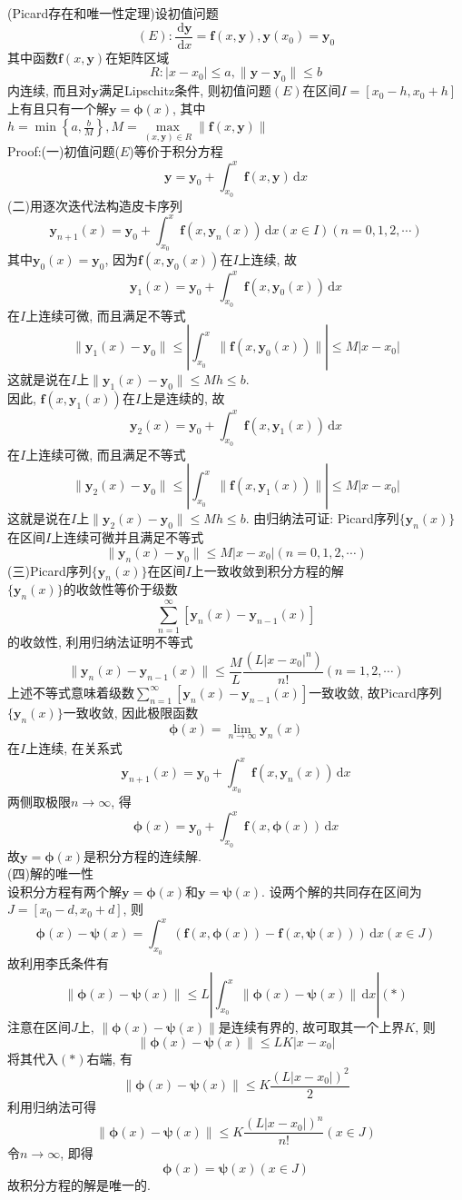 \documentclass[titlepage,11pt,a4paper,twoside]{report}
\makeatletter
\newcommand\diff{\,\mathrm{d}}
\newenvironment{solve}{\par
	\pushQED{\qed}%
	\normalfont \topsep1\p@\@plus6\p@\relax
	\trivlist
	\item\relax
	{\hspace*{\parindent}{\heiti 解}\@addpunct{:}}\hspace\labelsep\ignorespaces
}{%
	\popQED\endtrivlist\@endpefalse
}
\makeatother
\begin{document}
\begin{solve}
(Picard存在和唯一性定理)设初值问题
\[(E):\frac{\diff\bm{y}}{\diff x}=\bm{f}(x,\bm{y}),\bm{y}(x_0)=\bm{y}_0\]
其中函数$\bm{f}(x,\bm{y})$在矩阵区域\[R:|x-x_0|\leq a,\|\bm{y}-\bm{y}_0\|\leq b\]
内连续, 而且对$\bm{y}$满足Lipschitz条件, 则初值问题$(E)$在区间$I=[x_0-h,x_0+h]$上有且只有一个解$\bm{y}=\bm{\phi}(x)$, 其中$\displaystyle h=\min\left\{a,\frac{b}{M}\right\},M=\max\limits_{(x,\bm{y})\in R}\|\bm{f}(x,\bm{y})\|$\\
Proof:(一)初值问题($E$)等价于积分方程
\[\bm{y}=\bm{y}_0+\int_{x_0}^x\bm{f}(x,\bm{y})\diff x\]
(二)用逐次迭代法构造皮卡序列
\[\bm{y}_{n+1}(x)=\bm{y}_0+\int_{x_0}^x\bm{f}(x,\bm{y}_n(x))\diff x(x\in I)(n=0,1,2,\cdots)\]
其中$\bm{y}_0(x)=\bm{y}_0$, 因为$\bm{f}(x,\bm{y}_0(x))$在$I$上连续, 故
\[\bm{y}_1(x)=\bm{y}_0+\int_{x_0}^x\bm{f}(x,\bm{y}_0(x))\diff x\]
在$I$上连续可微, 而且满足不等式
\[\|\bm{y}_1(x)-\bm{y}_0\|\leq\left|\int_{x_0}^x\|\bm{f}(x,\bm{y}_0(x))\|\right|\leq M|x-x_0|\]
这就是说在$I$上$\|\bm{y}_1(x)-\bm{y}_0\|\leq Mh\leq b$.\\
因此, $\bm{f}(x,\bm{y}_1(x))$在$I$上是连续的, 故
\[\bm{y}_2(x)=\bm{y}_0+\int_{x_0}^x\bm{f}(x,\bm{y}_1(x))\diff x\]
在$I$上连续可微, 而且满足不等式
\[\|\bm{y}_2(x)-\bm{y}_0\|\leq\left|\int_{x_0}^x\|\bm{f}(x,\bm{y}_1(x))\|\right|\leq M|x-x_0|\]
这就是说在$I$上$\|\bm{y}_2(x)-\bm{y}_0\|\leq Mh\leq b$.
由归纳法可证: Picard序列$\{\bm{y}_n(x)\}$在区间$I$上连续可微并且满足不等式
\[\|\bm{y}_n(x)-\bm{y}_0\|\leq M|x-x_0|(n=0,1,2,\cdots)\]
(三)Picard序列$\{\bm{y}_n(x)\}$在区间$I$上一致收敛到积分方程的解\\
$\{\bm{y}_n(x)\}$的收敛性等价于级数
\[\sum_{n=1}^{\infty}[\bm{y}_{n}(x)-\bm{y}_{n-1}(x)]\]
的收敛性, 利用归纳法证明不等式
\[\|\bm{y}_n(x)-\bm{y}_{n-1}(x)\|\leq\frac{M}{L}\frac{(L|x-x_0|^n)}{n!}(n=1,2,\cdots)\]
上述不等式意味着级数$\sum\limits_{n=1}^{\infty}[\bm{y}_{n}(x)-\bm{y}_{n-1}(x)]$一致收敛, 故Picard序列$\{\bm{y}_n(x)\}$一致收敛, 因此极限函数
\[\bm{\phi}(x)=\lim_{n\to\infty}\bm{y}_n(x)\]
在$I$上连续, 在关系式
\[\bm{y}_{n+1}(x)=\bm{y}_0+\int_{x_0}^x\bm{f}(x,\bm{y}_n(x))\diff x\]
两侧取极限$n\to\infty$, 得
\[\bm{\phi}(x)=\bm{y}_0+\int_{x_0}^x\bm{f}(x,\bm{\phi}(x))\diff x\]
故$\bm{y}=\bm{\phi}(x)$是积分方程的连续解.\\
(四)解的唯一性\\
设积分方程有两个解$\bm{y}=\bm{\phi}(x)$和$\bm{y}=\bm{\psi}(x)$. 设两个解的共同存在区间为$J=[x_0-d,x_0+d]$, 则
\[\bm{\phi}(x)-\bm{\psi}(x)=\int_{x_0}^x\left(\bm{f}(x,\bm{\phi}(x))-\bm{f}(x,\bm{\psi}(x))\right)\diff x(x\in J)\]
故利用李氏条件有\[\|\bm{\phi}(x)-\bm{\psi}(x)\|\leq L\left|\int_{x_0}^x\|\bm{\phi}(x)-\bm{\psi}(x)\|\diff x\right|(*)\]
注意在区间$J$上, $\|\bm{\phi}(x)-\bm{\psi}(x)\|$是连续有界的, 故可取其一个上界$K$, 则
\[\|\bm{\phi}(x)-\bm{\psi}(x)\|\leq LK|x-x_0|\]
将其代入$(*)$右端, 有
\[\|\bm{\phi}(x)-\bm{\psi}(x)\|\leq K\frac{(L|x-x_0|)^2}{2}\]
利用归纳法可得
\[\|\bm{\phi}(x)-\bm{\psi}(x)\|\leq K\frac{(L|x-x_0|)^n}{n!}(x\in J)\]
令$n\to\infty$, 即得\[\bm{\phi}(x)=\bm{\psi}(x)(x\in J)\]
故积分方程的解是唯一的.
\end{solve}
\end{document}
